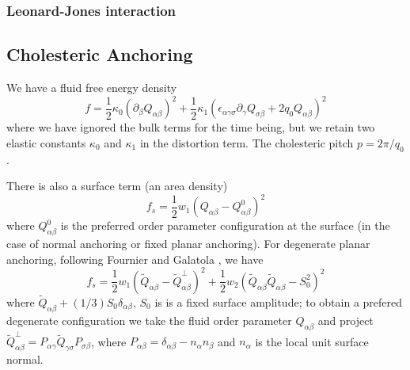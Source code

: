 \subsubsection{Leonard-Jones interaction}


\subsection{Cholesteric Anchoring}

We have a fluid free energy density
\begin{equation}
f = 
{\textstyle\frac{1}{2}} \kappa_0 (\partial_\beta Q_{\alpha\beta})^2
+ {\textstyle\frac{1}{2}}
 \kappa_1 (\epsilon_{\alpha\gamma\sigma} \partial_\gamma
Q_{\sigma\beta} + 2q_0 Q_{\alpha\beta})^2
\end{equation}
where we have ignored the bulk terms for the time being, but we retain
two elastic constants $\kappa_0$ and $\kappa_1$ in the distortion term.
The cholesteric pitch $p = 2\pi/q_0$.

There is also a surface term (an area density)
\begin{equation}
f_s = {\textstyle\frac{1}{2}} w_1 (Q_{\alpha\beta} - Q_{\alpha\beta}^0)^2
\end{equation}
where $Q^0_{\alpha\beta}$ is the preferred order parameter configuration
at the surface (in the case of normal anchoring or fixed planar anchoring).
For degenerate planar anchoring,
following Fournier and Galatola \cite{fournier2005}, we have
\begin{equation}
f_s = {\textstyle\frac{1}{2}} w_1 (\tilde{Q}_{\alpha\beta}
    - \tilde{Q}^\perp_{\alpha\beta})^2
    + {\textstyle\frac{1}{2}} w_2 (\tilde{Q}_{\alpha\beta}
                      \tilde{Q}_{\alpha\beta} - S^2_0)^2
\end{equation}
where $\tilde{Q}_{\alpha\beta} + (1/3)S_0 \delta_{\alpha\beta}$, $S_0$ is
is a fixed surface amplitude; to obtain a prefered degenerate
configuration we take the fluid order parameter $Q_{\alpha\beta}$ and
project $\tilde{Q}^\perp_{\alpha\beta} = P_{\alpha\gamma}
\tilde{Q}_{\gamma\sigma}
P_{\sigma\beta}$, where $P_{\alpha\beta} = \delta_{\alpha\beta}
- n_\alpha n_\beta$ and $n_\alpha$ is the local unit surface normal.

